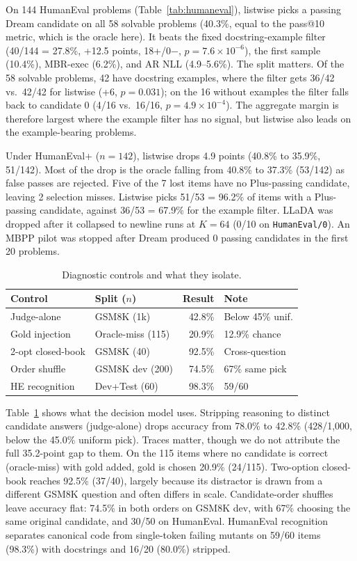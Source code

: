 On 144 HumanEval problems (Table~\ref{tab:humaneval}), listwise picks a passing Dream candidate on all 58 solvable problems (40.3\%, equal to the pass@10 metric, which is the oracle here). It beats the fixed docstring-example filter (40/144 = 27.8\%, +12.5 points, 18+/0$-$, $p=7.6\times 10^{-6}$), the first sample (10.4\%), MBR-exec (6.2\%), and AR NLL (4.9--5.6\%). The split matters. Of the 58 solvable problems, 42 have docstring examples, where the filter gets 36/42 vs.\ 42/42 for listwise (+6, $p=0.031$); on the 16 without examples the filter falls back to candidate 0 (4/16 vs.\ 16/16, $p=4.9\times 10^{-4}$). The aggregate margin is therefore largest where the example filter has no signal, but listwise also leads on the example-bearing problems.

Under HumanEval+ ($n=142$), listwise drops 4.9 points (40.8\% to 35.9\%, 51/142). Most of the drop is the oracle falling from 40.8\% to 37.3\% (53/142) as false passes are rejected. Five of the 7 lost items have no Plus-passing candidate, leaving 2 selection misses. Listwise picks 51/53 = 96.2\% of items with a Plus-passing candidate, against 36/53 = 67.9\% for the example filter. LLaDA was dropped after it collapsed to newline runs at $K=64$ (0/10 on \texttt{HumanEval/0}). An MBPP pilot was stopped after Dream produced 0 passing candidates in the first 20 problems.

\begin{table}[!t]
\centering
\caption{Diagnostic controls and what they isolate.}
\label{tab:controls}
\scriptsize
\setlength{\tabcolsep}{1.8pt}
\begin{tabular}{@{}llrl@{}}
\toprule
Control & Split ($n$) & Result & Note \\
\midrule
Judge-alone & GSM8K (1k) & 42.8\% & Below 45\% unif. \\
Gold injection & Oracle-miss (115) & 20.9\% & 12.9\% chance \\
2-opt closed-book & GSM8K (40) & 92.5\% & Cross-question \\
Order shuffle & GSM8K dev (200) & 74.5\% & 67\% same pick \\
HE recognition & Dev+Test (60) & 98.3\% & 59/60 \\
\bottomrule
\end{tabular}
\end{table}

Table~\ref{tab:controls} shows what the decision model uses. Stripping reasoning to distinct candidate answers (judge-alone) drops accuracy from 78.0\% to 42.8\% (428/1,000, below the 45.0\% uniform pick). Traces matter, though we do not attribute the full 35.2-point gap to them. On the 115 items where no candidate is correct (oracle-miss) with gold added, gold is chosen 20.9\% (24/115). Two-option closed-book reaches 92.5\% (37/40), largely because its distractor is drawn from a different GSM8K question and often differs in scale. Candidate-order shuffles leave accuracy flat: 74.5\% in both orders on GSM8K dev, with 67\% choosing the same original candidate, and 30/50 on HumanEval. HumanEval recognition separates canonical code from single-token failing mutants on 59/60 items (98.3\%) with docstrings and 16/20 (80.0\%) stripped.

